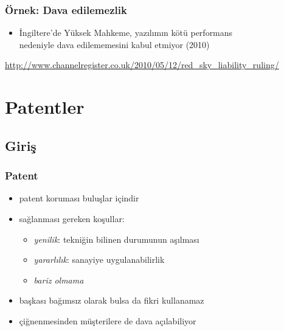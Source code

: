 \documentclass[dvipsnames]{beamer}
\theoremstyle{definition}
\theoremstyle{example}
\theoremstyle{plain}
\begin{document}
\begin{frame}
  \frametitle{Örnek: Dava edilemezlik}

  \begin{center}
  \end{center}

  \begin{itemize}
    \item İngiltere'de Yüksek Mahkeme, yazılımın kötü performans\\
      nedeniyle dava edilememesini kabul etmiyor (2010)
  \end{itemize}

  \medskip
  \tiny{\url{http://www.channelregister.co.uk/2010/05/12/red_sky_liability_ruling/}}\\
\end{frame}

\section{Patentler}

\subsection{Giriş}

\begin{frame}
  \frametitle{Patent}

  \begin{itemize}
    \item patent koruması \alert{buluşlar} içindir

    \medskip
    \item sağlanması gereken koşullar:
    \begin{itemize}
      \item \emph{yenilik}: tekniğin bilinen durumunun aşılması
      \item \emph{yararlılık}: sanayiye uygulanabilirlik
      \item \emph{bariz olmama}
    \end{itemize}

    \pause
    \medskip
    \item başkası bağımsız olarak bulsa da fikri kullanamaz

    \pause
    \medskip
    \item çiğnenmesinden müşterilere de dava açılabiliyor
  \end{itemize}
\end{frame}
\end{document}
